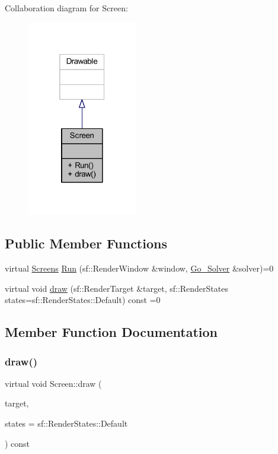 Collaboration diagram for Screen\+:
\nopagebreak
\begin{figure}[H]
\begin{center}
\leavevmode
\includegraphics[width=136pt]{class_screen__coll__graph}
\end{center}
\end{figure}
\subsection*{Public Member Functions}
\begin{DoxyCompactItemize}
\item 
virtual \hyperlink{_globals_8h_a3d5776bab98402b03be09156bacf4f68}{Screens} \hyperlink{class_screen_abbb6a9b3d8fdc44620080e54d090e8c7}{Run} (sf\+::\+Render\+Window \&window, \hyperlink{class_go___solver}{Go\+\_\+\+Solver} \&solver)=0
\item 
virtual void \hyperlink{class_screen_abcb5544dfe717c7da181520803f43e25}{draw} (sf\+::\+Render\+Target \&target, sf\+::\+Render\+States states=sf\+::\+Render\+States\+::\+Default) const =0
\end{DoxyCompactItemize}


\subsection{Member Function Documentation}
\mbox{\label{class_screen_abcb5544dfe717c7da181520803f43e25}} 
\subsubsection{\texorpdfstring{draw()}{draw()}}
{\footnotesize\ttfamily virtual void Screen\+::draw (\begin{DoxyParamCaption}\item[{sf\+::\+Render\+Target \&}]{target,  }\item[{sf\+::\+Render\+States}]{states = {\ttfamily sf\+:\+:RenderStates\+:\+:Default} }\end{DoxyParamCaption}) const\hspace{0.3cm}{\ttfamily [pure virtual]}}



